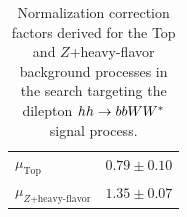 \begin{table}[!htb]
    \begin{center}
        \caption{
            Normalization correction factors derived for the Top and $Z$+heavy-flavor background
            processes in the search targeting the dilepton $hh \rightarrow bbWW^*$ signal process.
        }
        \label{tab:hh_norm_factors}
        \begin{tabular}{l | c}
        \hline
        \hline
            $\mu_{\text{Top}}$ & $0.79 \pm 0.10$ \\
            $\mu_{Z\text{+heavy-flavor}}$ & $1.35 \pm 0.07$ \\
        \hline
        \hline
        \end{tabular}
    \end{center}
\end{table}
